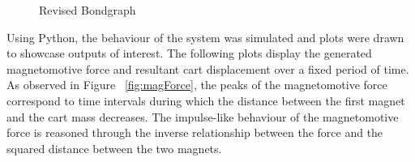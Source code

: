 \documentclass[notitlepage,10pt]{report}
\begin{document}
\begin{multicols}{2}
\begin{figure}
    \caption{Revised Bondgraph}
    \label{fig:bondgraph2}
\end{figure}
Using Python, the behaviour of the system was simulated and plots were drawn to showcase outputs of interest. The following plots display the generated magnetomotive force and resultant cart displacement over a fixed period of time. As observed in Figure ~\ref{fig:magForce}, the peaks of the magnetomotive force correspond to time intervals during which the distance between the first magnet and the cart mass decreases. The impulse-like behaviour of the magnetomotive force is reasoned through the inverse relationship between the force and the squared distance between the two magnets.


\end{multicols}
\end{document}

